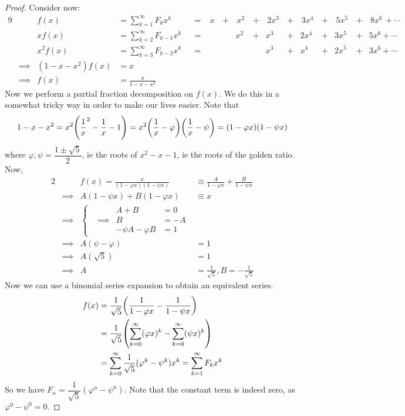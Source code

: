 \documentclass[fleqn,a4paper,11pt]{article}
\begin{document}
\begin{proof}
    Consider now:
    \begin{alignat*}{9}
    && f(x) &= \sum_{k = 1}^\infty F_k x^k
        &&=&\; x\, &+&\, x^2\, &+&\, 2x^3\, &+&\,
            3x^4\, &+&\, 5x^5\, &+&\, 8x^6\, + \dotsb \\
    && x f(x) &= \sum_{k = 2}^\infty F_{k - 1} x^k
        &&=& &&x^2 &+& x^3 &+& 2x^4 &+& 3x^5 &+& 5x^6 + \dotsb \\
    && x^2 f(x) &= \sum_{k = 3}^\infty F_{k - 2}x^k
        &&=& &&&& x^3 &+& x^4 &+& 2x^5 &+& 3x^6 + \dotsb \\
    &\implies& (1 - x - x^2) f(x) &= x \\
    &\implies& f(x) &= \frac x{1 - x - x^2}
    \end{alignat*}
    Now we perform a partial fraction decomposition on \(f(x)\). We do this in a
    somewhat tricky way in order to make our lives easier. Note that
    \begin{equation*}
    1 - x - x^2 = x^2 \pqty{\frac 1x^2 - \frac 1x - 1}
        = x^2\pqty{\frac 1x - \varphi}\pqty{\frac 1x - \psi}
        = (1 - \varphi x)(1 - \psi x)
    \end{equation*}
    where \(\varphi, \psi = \dfrac{1 \pm \sqrt 5}2\), ie the roots of
    \(x^2 - x - 1\), ie the roots of the golden ratio. Now,
    \begin{alignat*}{2}
    && f(x) = \frac x{(1 - \varphi x)(1 - \psi x)}
        &\equiv \frac A{1 - \varphi x} + \frac B{1 - \psi x} \\
    &\implies& A(1 - \psi x) + B(1 - \varphi x) &\equiv x \\
    &\implies& \left\{
        \begin{aligned}
            && A + B &= 0 \\
            &\implies& B &= -A  \\
            && -\psi A - \varphi B &= 1
        \end{aligned} \right. \\
    &\implies& A(\psi - \varphi) &= 1 \\
    &\implies& A(\sqrt 5) &= 1 \\
    &\implies& A &= \frac 1{\sqrt 5}, B = -\frac 1{\sqrt 5}
    \end{alignat*}
    Now we can use a binomial series expansion to obtain an equivalent series.
    \begin{align*}
    f(x) &= \frac 1{\sqrt 5}\pqty{\frac 1{1 - \varphi x}
                                - \frac 1{1 - \psi x}} \\
    &= \frac 1{\sqrt 5}\pqty{\sum_{k = 0}^\infty (\varphi x)^k
                           - \sum_{k = 0}^\infty (\psi x)^k} \\
    &= \sum_{k = 0}^\infty \frac 1{\sqrt 5}(\varphi^k - \psi^k)x^k
    = \sum_{k = 1}^\infty F_k x^k
    \end{align*}
    So we have \(F_n = \dfrac 1{\sqrt 5}(\varphi^n - \psi^n)\). Note that the
    constant term is indeed zero, as \(\varphi^0 - \psi^0 = 0\).
    \end{proof}
\end{document}
